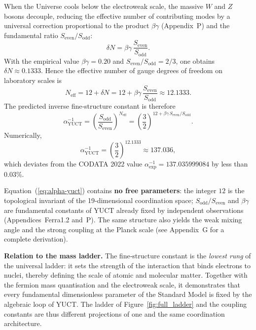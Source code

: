 \documentclass[12pt,a4paper]{article}
\begin{document}
When the Universe cools below the electroweak scale, the massive \(W\) and \(Z\)
bosons decouple, reducing the effective number of contributing modes by a universal
correction proportional to the product \(\beta\gamma\) (Appendix~P) and the
fundamental ratio \(S_{\mathrm{even}}/S_{\mathrm{odd}}\):
\begin{equation}
	\delta N = \beta\gamma \, \frac{S_{\mathrm{even}}}{S_{\mathrm{odd}}} .
\end{equation}
With the empirical value \(\beta\gamma = 0.20\) and \(S_{\mathrm{even}}/S_{\mathrm{odd}} = 2/3\),
one obtains \(\delta N \approx 0.1333\).  Hence the effective number of gauge
degrees of freedom on laboratory scales is
\begin{equation}
	N_{\mathrm{eff}} = 12 + \delta N = 12 + \beta\gamma\,\frac{S_{\mathrm{even}}}{S_{\mathrm{odd}}}
	\approx 12.1333 .
\end{equation}
The predicted inverse fine‑structure constant is therefore
\begin{equation}
	\boxed{\alpha^{-1}_{\mathrm{YUCT}} =
		\left(\frac{S_{\mathrm{odd}}}{S_{\mathrm{even}}}\right)^{N_{\mathrm{eff}}}
		= \left(\frac{3}{2}\right)^{12 + \beta\gamma\,S_{\mathrm{even}}/S_{\mathrm{odd}}} } .
	\label{eq:alpha-yuct}
\end{equation}
Numerically,
\[
\alpha^{-1}_{\mathrm{YUCT}} = \left(\frac{3}{2}\right)^{12.1333} \approx 137.036 ,
\]
which deviates from the CODATA 2022 value \(\alpha^{-1}_{\mathrm{exp}} = 137.035999084\)
by less than \(0.03\%\).

Equation~(\ref{eq:alpha-yuct}) contains \textbf{no free parameters}: the integer
\(12\) is the topological invariant of the 19‑dimensional coordination space;
\(S_{\mathrm{odd}}/S_{\mathrm{even}}\) and \(\beta\gamma\) are fundamental constants
of YUCT already fixed by independent observations (Appendices~Ferra1.2 and~P).
The same structure also yields the weak mixing angle and the strong coupling at the
Planck scale (see Appendix~G for a complete derivation).

\textbf{Relation to the mass ladder.}  The fine‑structure constant is the
\emph{lowest rung} of the universal ladder: it sets the strength of the
interaction that binds electrons to nuclei, thereby defining the scale of atomic
and molecular matter.  Together with the fermion mass quantisation and the
electroweak scale, it demonstrates that every fundamental dimensionless parameter
of the Standard Model is fixed by the algebraic loop of YUCT.  The ladder of
Figure~\ref{fig:full_ladder} and the coupling constants are thus different
projections of one and the same coordination architecture.
\end{document}
